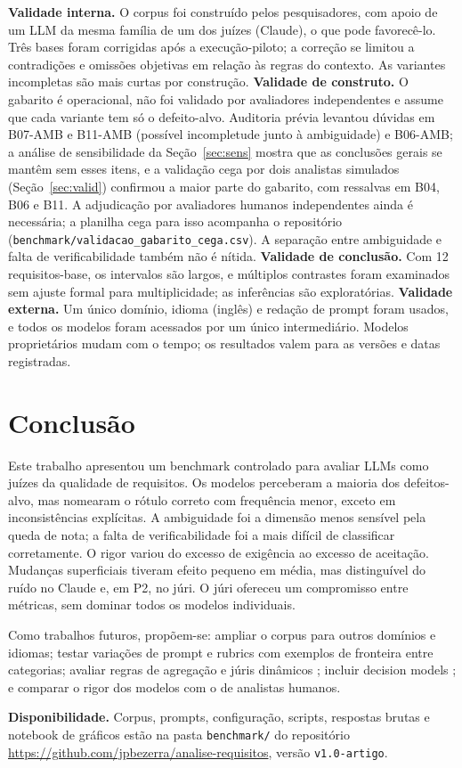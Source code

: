 \documentclass[12pt]{article}
\begin{document}
\textbf{Validade interna.} O corpus foi construído pelos pesquisadores, com apoio de um LLM da mesma família de um dos juízes (Claude), o que pode favorecê-lo. Três bases foram corrigidas após a execução-piloto; a correção se limitou a contradições e omissões objetivas em relação às regras do contexto. As variantes incompletas são mais curtas por construção.
\textbf{Validade de construto.} O gabarito é operacional, não foi validado por avaliadores independentes e assume que cada variante tem só o defeito-alvo. Auditoria prévia levantou dúvidas em B07-AMB e B11-AMB (possível incompletude junto à ambiguidade) e B06-AMB; a análise de sensibilidade da Seção~\ref{sec:sens} mostra que as conclusões gerais se mantêm sem esses itens, e a validação cega por dois analistas simulados (Seção~\ref{sec:valid}) confirmou a maior parte do gabarito, com ressalvas em B04, B06 e B11. A adjudicação por avaliadores humanos independentes ainda é necessária; a planilha cega para isso acompanha o repositório (\texttt{benchmark/validacao\_gabarito\_cega.csv}). A separação entre ambiguidade e falta de verificabilidade também não é nítida.
\textbf{Validade de conclusão.} Com 12 requisitos-base, os intervalos são largos, e múltiplos contrastes foram examinados sem ajuste formal para multiplicidade; as inferências são exploratórias.
\textbf{Validade externa.} Um único domínio, idioma (inglês) e redação de prompt foram usados, e todos os modelos foram acessados por um único intermediário. Modelos proprietários mudam com o tempo; os resultados valem para as versões e datas registradas.

\section{Conclusão}

Este trabalho apresentou um benchmark controlado para avaliar LLMs como juízes da qualidade de requisitos. Os modelos perceberam a maioria dos defeitos-alvo, mas nomearam o rótulo correto com frequência menor, exceto em inconsistências explícitas. A ambiguidade foi a dimensão menos sensível pela queda de nota; a falta de verificabilidade foi a mais difícil de classificar corretamente. O rigor variou do excesso de exigência ao excesso de aceitação. Mudanças superficiais tiveram efeito pequeno em média, mas distinguível do ruído no Claude e, em P2, no júri. O júri ofereceu um compromisso entre métricas, sem dominar todos os modelos individuais.

Como trabalhos futuros, propõem-se: ampliar o corpus para outros domínios e idiomas; testar variações de prompt e rubrics com exemplos de fronteira entre categorias; avaliar regras de agregação e júris dinâmicos \citep{li2025jury}; incluir decision models \citep{li2026jev}; e comparar o rigor dos modelos com o de analistas humanos.

\textbf{Disponibilidade.} Corpus, prompts, configuração, scripts, respostas brutas e notebook de gráficos estão na pasta \texttt{benchmark/} do repositório \url{https://github.com/jpbezerra/analise-requisitos}, versão \texttt{v1.0-artigo}.



\end{document}
